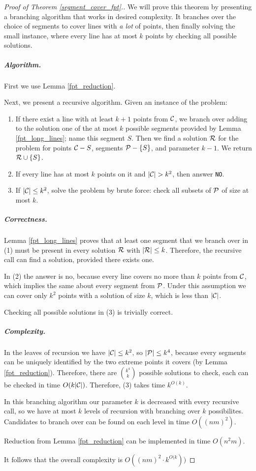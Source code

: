 \begin{proof}[Proof of Theorem \ref{segment_cover_fpt}.]\leavevmode

We will prove this theorem by presenting a branching algorithm that
works in desired complexity. It branches over the
choice of segments to cover lines with \textit{a lot} of points,
then finally solving the small instance, where
every line has at most $k$ points by checking all possible solutions.

\subparagraph{Algorithm.}
First we use Lemma \ref{fpt_reduction}.

Next, we present a recursive algorithm. Given an instance of the problem:

\begin{enumerate}[label={(\arabic*)}]
\item If there exist a line with at least $k+1$ points from $\mathcal{C}$, we branch over
adding to the solution one of the at most $k$ possible segments
provided by Lemma \ref{fpt_long_lines}; name this segment $S$.
Then we find a solution $\mathcal{R}$
for the problem for points $\mathcal{C} - S$, segments $\mathcal{P} - \{S\}$,
and parameter $k-1$. We return $\mathcal{R} \cup \{S\}$.
\item If every line has at most $k$ points on it and $|\mathcal{C}| > k^2$,
then answer \texttt{NO}.
\item If $|\mathcal{C}| \le k^2$, solve the problem by brute force:
check all subsets of $\mathcal{P}$ of size at most $k$.
\end{enumerate}

\subparagraph{Correctness.}

Lemma \ref{fpt_long_lines} proves that at least one segment that we
branch over in (1) must be present in every solution $\mathcal{R}$ with $|\mathcal{R}| \le k$.
Therefore, the recursive call can find a solution, provided there exists one.

In (2) the answer is no, because every line covers no more than $k$ points
from $\mathcal{C}$, which implies the same about every segment from $\mathcal{P}$.
Under this assumption
we can cover only $k^2$ points with a solution of size $k$, which is less
than $|\mathcal{C}|$.

Checking all possible solutions in (3) is trivially correct.


\subparagraph{Complexity.}

In the leaves of recursion we have $|\mathcal{C}| \le k^2$, so $|\mathcal{P}| \le k^4$, because
every segments can be uniquely identified by the two extreme points it covers
(by Lemma \ref{fpt_reduction}). Therefore, there are $\binom{k^4}{k}$
possible solutions to check, each can be checked in time $O(k|\mathcal{C}|)$.
Therefore, (3) takes time $k^{O(k)}$.


In this branching algorithm our parameter $k$ is decreased with every
recursive call, so we have at most $k$ levels of recursion with
branching over $k$ possibilites. Candidates to branch over
can be found on each level in time $O((nm)^2)$.

Reduction from Lemma \ref{fpt_reduction} can be implemented in time $O(n^2m)$.

It follows that the overall complexity is $O((nm)^2 \cdot k^{O(k}))$
\end{proof}

